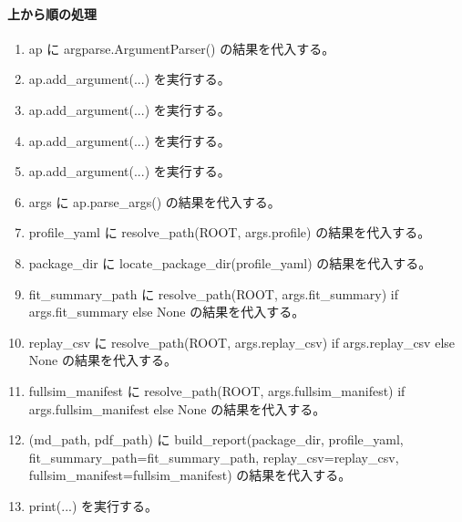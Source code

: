 \documentclass[a4paper,11pt]{article}
\begin{document}
            \paragraph{上から順の処理}
            \begin{enumerate}[leftmargin=1.8em]
            \item ap に argparse.ArgumentParser() の結果を代入する。
\item ap.add\_argument(...) を実行する。
\item ap.add\_argument(...) を実行する。
\item ap.add\_argument(...) を実行する。
\item ap.add\_argument(...) を実行する。
\item args に ap.parse\_args() の結果を代入する。
\item profile\_yaml に resolve\_path(ROOT, args.profile) の結果を代入する。
\item package\_dir に locate\_package\_dir(profile\_yaml) の結果を代入する。
\item fit\_summary\_path に resolve\_path(ROOT, args.fit\_summary) if args.fit\_summary else None の結果を代入する。
\item replay\_csv に resolve\_path(ROOT, args.replay\_csv) if args.replay\_csv else None の結果を代入する。
\item fullsim\_manifest に resolve\_path(ROOT, args.fullsim\_manifest) if args.fullsim\_manifest else None の結果を代入する。
\item (md\_path, pdf\_path) に build\_report(package\_dir, profile\_yaml, fit\_summary\_path=fit\_summary\_path, replay\_csv=replay\_csv, fullsim\_manifest=fullsim\_manifest) の結果を代入する。
\item print(...) を実行する。
            \end{enumerate}
\end{document}
